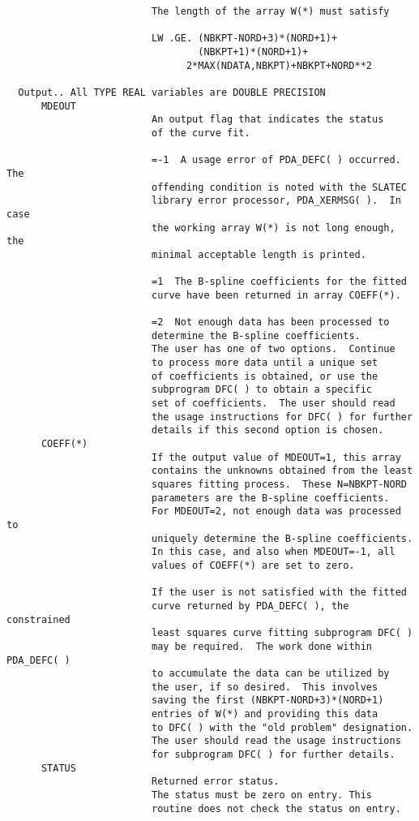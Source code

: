 \begin{verbatim}
                         The length of the array W(*) must satisfy

                         LW .GE. (NBKPT-NORD+3)*(NORD+1)+
                                 (NBKPT+1)*(NORD+1)+
                               2*MAX(NDATA,NBKPT)+NBKPT+NORD**2

  Output.. All TYPE REAL variables are DOUBLE PRECISION
      MDEOUT
                         An output flag that indicates the status
                         of the curve fit.

                         =-1  A usage error of PDA_DEFC( ) occurred.  The
                         offending condition is noted with the SLATEC
                         library error processor, PDA_XERMSG( ).  In case
                         the working array W(*) is not long enough, the
                         minimal acceptable length is printed.

                         =1  The B-spline coefficients for the fitted
                         curve have been returned in array COEFF(*).

                         =2  Not enough data has been processed to
                         determine the B-spline coefficients.
                         The user has one of two options.  Continue
                         to process more data until a unique set
                         of coefficients is obtained, or use the
                         subprogram DFC( ) to obtain a specific
                         set of coefficients.  The user should read
                         the usage instructions for DFC( ) for further
                         details if this second option is chosen.
      COEFF(*)
                         If the output value of MDEOUT=1, this array
                         contains the unknowns obtained from the least
                         squares fitting process.  These N=NBKPT-NORD
                         parameters are the B-spline coefficients.
                         For MDEOUT=2, not enough data was processed to
                         uniquely determine the B-spline coefficients.
                         In this case, and also when MDEOUT=-1, all
                         values of COEFF(*) are set to zero.

                         If the user is not satisfied with the fitted
                         curve returned by PDA_DEFC( ), the constrained
                         least squares curve fitting subprogram DFC( )
                         may be required.  The work done within PDA_DEFC( )
                         to accumulate the data can be utilized by
                         the user, if so desired.  This involves
                         saving the first (NBKPT-NORD+3)*(NORD+1)
                         entries of W(*) and providing this data
                         to DFC( ) with the "old problem" designation.
                         The user should read the usage instructions
                         for subprogram DFC( ) for further details.
      STATUS
                         Returned error status.
                         The status must be zero on entry. This
                         routine does not check the status on entry.


\end{verbatim}
